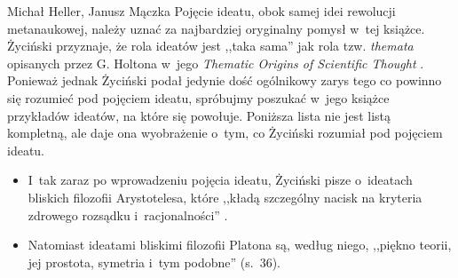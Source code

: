 \begin{newrevplenv2auth}{Michał Heller, Janusz Mączka}
Pojęcie ideatu, obok samej idei rewolucji metanaukowej, należy uznać za najbardziej oryginalny pomysł w~tej książce. Życiński przyznaje, że rola ideatów jest ,,taka sama'' jak rola tzw. \textit{themata} opisanych przez G. Holtona w~jego \textit{Thematic Origins of Scientific Thought}
 \parencite*{holton_1988}.
Ponieważ jednak Życiński podał jedynie dość ogólnikowy zarys tego co powinno się rozumieć pod pojęciem ideatu, spróbujmy poszukać w~jego książce przykładów ideatów, na które się powołuje. Poniższa lista nie jest listą kompletną, ale daje ona wyobrażenie o~tym, co Życiński rozumiał pod pojęciem ideatu.

\begin{itemize}
\item I~tak zaraz po wprowadzeniu pojęcia ideatu, Życiński pisze o~ideatach bliskich filozofii Arystotelesa, które ,,kładą szczególny nacisk na kryteria zdrowego rozsądku i~racjonalności''
\parencite[][s.~35]{zycinski_struktura_2013}.%

\item Natomiast ideatami bliskimi filozofii Platona są, według niego, ,,piękno teorii, jej prostota, symetria i~tym podobne''
(s.~36).


\end{itemize}
\end{newrevplenv2auth}
